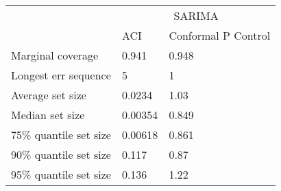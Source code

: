 \begin{tabular}{lll}
\toprule
& \multicolumn{2}{c}{SARIMA} \\
& ACI & Conformal P Control \\
\midrule
Marginal coverage & 0.941 & 0.948 \\
Longest err sequence & 5 & 1 \\
Average set size & 0.0234 & 1.03 \\
Median set size & 0.00354 & 0.849 \\
75\% quantile set size & 0.00618 & 0.861 \\
90\% quantile set size & 0.117 & 0.87 \\
95\% quantile set size & 0.136 & 1.22 \\
\bottomrule
\end{tabular}
